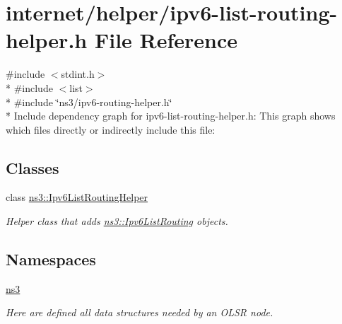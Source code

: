 \hypertarget{ipv6-list-routing-helper_8h}{}\section{internet/helper/ipv6-\/list-\/routing-\/helper.h File Reference}
\label{ipv6-list-routing-helper_8h}
{\ttfamily \#include $<$stdint.\+h$>$}\\*
{\ttfamily \#include $<$list$>$}\\*
{\ttfamily \#include \char`\"{}ns3/ipv6-\/routing-\/helper.\+h\char`\"{}}\\*
Include dependency graph for ipv6-\/list-\/routing-\/helper.h\+:
This graph shows which files directly or indirectly include this file\+:
\subsection*{Classes}
\begin{DoxyCompactItemize}
\item 
class \hyperlink{classns3_1_1Ipv6ListRoutingHelper}{ns3\+::\+Ipv6\+List\+Routing\+Helper}
\begin{DoxyCompactList}\small\item\em Helper class that adds \hyperlink{classns3_1_1Ipv6ListRouting}{ns3\+::\+Ipv6\+List\+Routing} objects. \end{DoxyCompactList}\end{DoxyCompactItemize}
\subsection*{Namespaces}
\begin{DoxyCompactItemize}
\item 
 \hyperlink{namespacens3}{ns3}
\begin{DoxyCompactList}\small\item\em Here are defined all data structures needed by an O\+L\+SR node. \end{DoxyCompactList}\end{DoxyCompactItemize}
